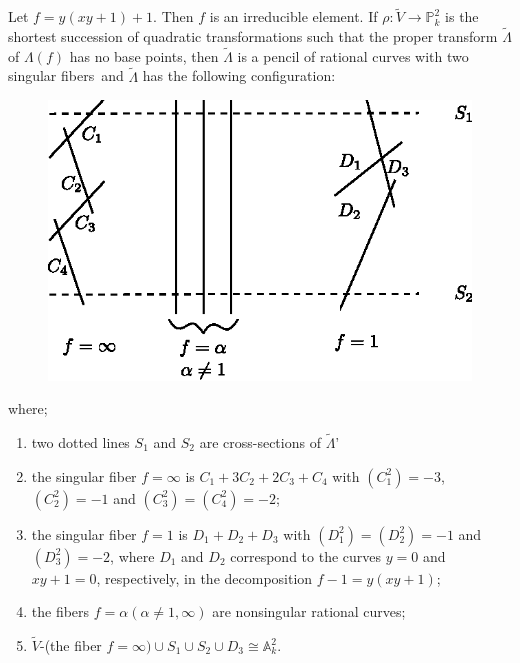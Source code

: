 \begin{example*}
Let $f=y(xy+1)+1$. Then $f$ is an irreducible element. If
$\rho:\widetilde{V}\to \mathbb{P}^{2}_{k}$ is the shortest succession
of quadratic transformations such that the proper transform
$\widetilde{\Lambda}$ of $\Lambda(f)$ has no base points, then
$\widetilde{\Lambda}$ is a pencil of rational curves with two singular
fibers\pageoriginale\ and $\widetilde{\Lambda}$ has the following
configuration:
\begin{figure}[H]
\centering
\includegraphics[scale=.9]{figures/chap2-fig3.eps}
\end{figure}
where;
\begin{enumerate}
\renewcommand{\labelenumi}{\theenumi$^{\circ}$}
\item two dotted lines $S_{1}$ and $S_{2}$ are cross-sections of
  $\widetilde{\Lambda}$' 

\item the singular fiber $f=\infty$ is $C_{1}+3C_{2}+2C_{3}+C_{4}$
  with $(C^{2}_{1})=-3$, $(C^{2}_{2})=-1$ and
  $(C^{2}_{3})=(C^{2}_{4})=-2$;

\item the singular fiber $f=1$ is $D_{1}+D_{2}+D_{3}$ with
  $(D^{2}_{1})=(D^{2}_{2})=-1$ and $(D^{2}_{3})=-2$, where $D_{1}$ and
  $D_{2}$ correspond to the curves $y=0$ and $xy+1=0$, respectively,
  in the decomposition $f-1=y(xy+1)$;

\item the fibers $f=\alpha(\alpha\neq 1,\infty)$ are nonsingular
  rational curves;

\item $\widetilde{V}$-(the fiber $f=\infty)\cup S_{1}\cup S_{2}\cup
  D_{3}\cong \mathbb{A}^{2}_{k}$.
\end{enumerate}
\end{example*}

